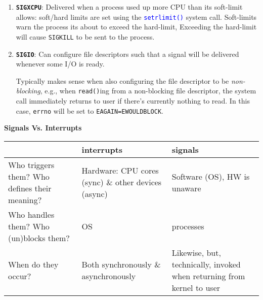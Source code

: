 \documentclass[openany,12pt]{book}
\newcommand{\code}[1]{\texttt{#1}}
\newcommand{\blue}[1]{\textcolor{blue}{#1}}
\begin{document}
\begin{enumerate}
    \item \textbf{\code{SIGXCPU}}: Delivered when a process used up more CPU than its soft-limit allows: soft/hard limits are set using the \blue{\code{setrlimit()}} system call. Soft-limits warn the process its about to exceed the hard-limit, Exceeding the hard-limit will cause \code{SIGKILL} to be sent to the process.

    \item \textbf{\code{SIGIO}}: Can configure file descriptors such that a signal will be delivered whenever some I/O is ready.

          Typically makes sense when also configuring the file descriptor to be \textit{non-blocking}, e.g., when \code{read()}ing from a non-blocking file descriptor, the system call immediately returns to user if there's currently nothing to read. In this case, \code{errno} will be set to \code{EAGAIN=EWOULDBLOCK}.
\end{enumerate}


\begin{samepage}
    \begin{center}
        \textbf{Signals Vs. Interrupts}
        \begin{tabular}{|>{\raggedright\arraybackslash}p{4.5cm}|>{\raggedright\arraybackslash}p{5.5cm}|>{\raggedright\arraybackslash}p{5.5cm}|}
            \hline
            \rowcolor{blue!30}
             & \textbf{interrupts}                                                                      & \textbf{signals} \\
            \hline
            Who triggers them? \newline Who defines their meaning?
             & Hardware: \newline CPU cores (sync) \& other devices (async)
             & Software (OS), \newline HW is unaware                                                                       \\
            \hline
            Who handles them? \newline Who (un)blocks them?
             & OS
             & processes                                                                                                   \\
            \hline
            When do they occur?
             & Both synchronously \& asynchronously
             & Likewise, but, technically, \newline invoked when returning \newline from kernel to user                    \\
            \hline
        \end{tabular}
    \end{center}
\end{samepage}
\end{document}
